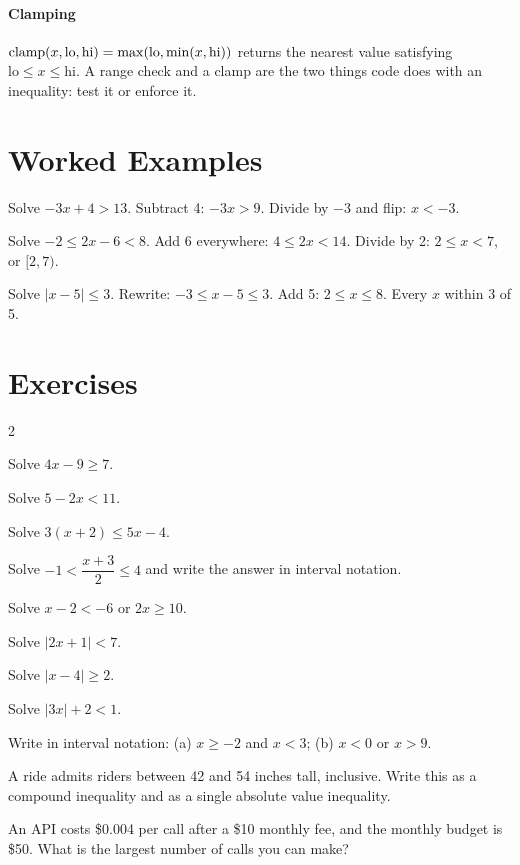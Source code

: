 \paragraph{Clamping} $\operatorname{clamp}(x, \text{lo}, \text{hi}) = \max(\text{lo}, \min(x, \text{hi}))$ returns the nearest value satisfying $\text{lo} \le x \le \text{hi}$. A range check and a clamp are the two things code does with an inequality: test it or enforce it.

\section{Worked Examples}

\begin{example}
Solve $-3x + 4 > 13$.
\solution Subtract 4: $-3x > 9$. Divide by $-3$ and flip: $x < -3$.
\end{example}

\begin{example}
Solve $-2 \le 2x - 6 < 8$.
\solution Add 6 everywhere: $4 \le 2x < 14$. Divide by 2: $2 \le x < 7$, or $[2, 7)$.
\end{example}

\begin{example}
Solve $|x - 5| \le 3$.
\solution Rewrite: $-3 \le x - 5 \le 3$. Add 5: $2 \le x \le 8$. Every $x$ within 3 of 5.
\end{example}

\section{Exercises}

\begin{multicols}{2}
\begin{exercises}
\item Solve $4x - 9 \ge 7$.
\item Solve $5 - 2x < 11$.
\item Solve $3(x + 2) \le 5x - 4$.
\item Solve $-1 < \dfrac{x + 3}{2} \le 4$ and write the answer in interval notation.
\item Solve $x - 2 < -6$ or $2x \ge 10$.
\item Solve $|2x + 1| < 7$.
\item Solve $|x - 4| \ge 2$.
\item Solve $|3x| + 2 < 1$.
\item Write in interval notation: (a) $x \ge -2$ and $x < 3$; (b) $x < 0$ or $x > 9$.
\item A ride admits riders between 42 and 54 inches tall, inclusive. Write this as a compound inequality and as a single absolute value inequality.
\item An API costs \$0.004 per call after a \$10 monthly fee, and the monthly budget is \$50. What is the largest number of calls you can make?
\end{exercises}
\end{multicols}

